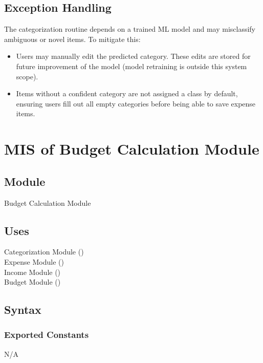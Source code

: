 \documentclass[12pt, titlepage]{article}
\begin{document}
\subsection{Exception Handling}

The categorization routine depends on a trained ML model and may misclassify ambiguous or novel items. To mitigate this:

\begin{itemize}
    \item Users may manually edit the predicted category. These edits are stored for future improvement of the model (model retraining is outside this system scope).
    \item Items without a confident category are not assigned a class by default, ensuring users fill out all empty categories before being able to save expense items.
\end{itemize}

\newpage



\section{MIS of Budget Calculation Module}\label{budget_calculation_module}

\subsection{Module}

Budget Calculation Module

\subsection{Uses}
Categorization Module ()\\
Expense Module ()\\
Income Module ()\\
Budget Module ()\\

\subsection{Syntax}

\subsubsection{Exported Constants}
N/A
\end{document}
